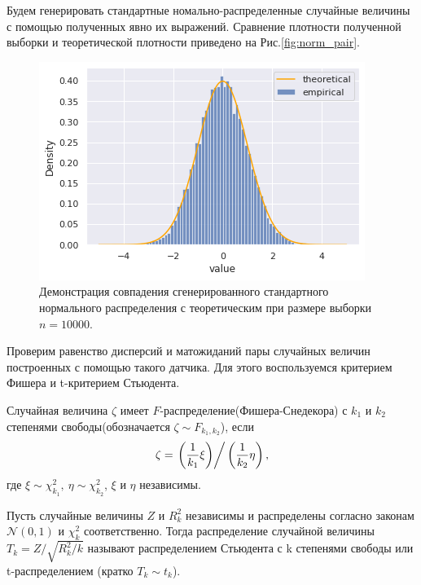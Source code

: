 Будем генерировать стандартные номально-распределенные случайные величины с помощью
 полученных явно их выражений. Сравнение плотности полученной выборки и теоретической
 плотности приведено на Рис.\eqref{fig:norm_pair}.

\begin{figure}[ht]
	\centering
	\includegraphics[width = 0.8\linewidth]{"./resources/norm_pair.png"}
	\caption{Демонстрация совпадения сгенерированного стандартного нормального
	 распределения с теоретическим при размере выборки $ n = 10000 $.}
    \label{fig:norm_pair}
\end{figure}

Проверим равенство дисперсий и матожиданий пары случайных величин построенных с
 помощью такого датчика. Для этого воспользуемся критерием Фишера и t-критерием
 Стьюдента.
\begin{definition}
	Случайная величина $ \zeta $ имеет $ F $-распределение(Фишера-Снедекора) с 
	 $k_1$ и $k_2$
	 степенями свободы(обозначается $ \zeta \sim F_{k_1,k_2}$), если
	$$
	 \zeta = \left. \left( \dfrac{1}{k_1} \xi \right) \right/ \left( \dfrac{1}{k_2}
	  \eta \right),
	$$
	где $ \xi \sim \chi_{k_1}^2, \ \eta \sim \chi_{k_2}^2 $, $ \xi $ и $ \eta $
	 независимы.
\end{definition}

\begin{definition}
	Пусть случайные величины $ Z $ и $ R_k^2 $ независимы и распределены согласно
	 законам $ \mathcal{N}(0,1) $ и $ \chi_k^2 $ соответственно. Тогда распределение
	 случайной величины $ T_k  = Z / \sqrt{R_k^2 / k} $ называют
	 распределением Стьюдента с k степенями свободы или t-распределением
	 (кратко $ T_k \sim t_k $).
\end{definition}

